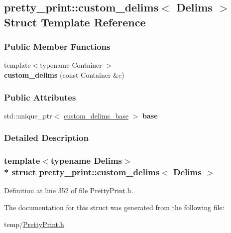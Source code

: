 \hypertarget{structpretty__print_1_1custom__delims}{}\subsection{pretty\+\_\+print\+:\+:custom\+\_\+delims$<$ Delims $>$ Struct Template Reference}
\label{structpretty__print_1_1custom__delims}
\subsubsection*{Public Member Functions}
\begin{DoxyCompactItemize}
\item 
{\footnotesize template$<$typename Container $>$ }\\{\bfseries custom\+\_\+delims} (const Container \&c)\hypertarget{structpretty__print_1_1custom__delims_a2a409f29696fc04d2d0dc952e78f3fb1}{}\label{structpretty__print_1_1custom__delims_a2a409f29696fc04d2d0dc952e78f3fb1}

\end{DoxyCompactItemize}
\subsubsection*{Public Attributes}
\begin{DoxyCompactItemize}
\item 
std\+::unique\+\_\+ptr$<$ \hyperlink{structpretty__print_1_1custom__delims__base}{custom\+\_\+delims\+\_\+base} $>$ {\bfseries base}\hypertarget{structpretty__print_1_1custom__delims_abb42668f748d45747781c92c6d6def3b}{}\label{structpretty__print_1_1custom__delims_abb42668f748d45747781c92c6d6def3b}

\end{DoxyCompactItemize}


\subsubsection{Detailed Description}
\subsubsection*{template$<$typename Delims$>$\\*
struct pretty\+\_\+print\+::custom\+\_\+delims$<$ Delims $>$}



Definition at line 352 of file Pretty\+Print.\+h.



The documentation for this struct was generated from the following file\+:\begin{DoxyCompactItemize}
\item 
temp/\hyperlink{PrettyPrint_8h}{Pretty\+Print.\+h}\end{DoxyCompactItemize}
